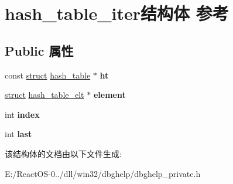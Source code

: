 \hypertarget{structhash__table__iter}{}\section{hash\+\_\+table\+\_\+iter结构体 参考}
\label{structhash__table__iter}
\subsection*{Public 属性}
\begin{DoxyCompactItemize}
\item 
\mbox{\label{structhash__table__iter_a9c7711461eefb446afc3075f40d1921c}} 
const \hyperlink{interfacestruct}{struct} \hyperlink{structhash__table}{hash\+\_\+table} $\ast$ {\bfseries ht}
\item 
\mbox{\label{structhash__table__iter_a4a2b88d32cbe86902d2c69e446b9d430}} 
\hyperlink{interfacestruct}{struct} \hyperlink{structhash__table__elt}{hash\+\_\+table\+\_\+elt} $\ast$ {\bfseries element}
\item 
\mbox{\label{structhash__table__iter_af8f2dc8cb065f8d716a50fe6f27ced74}} 
int {\bfseries index}
\item 
\mbox{\label{structhash__table__iter_aa6f52cdb888d4850fdef23527fae5e0d}} 
int {\bfseries last}
\end{DoxyCompactItemize}


该结构体的文档由以下文件生成\+:\begin{DoxyCompactItemize}
\item 
E\+:/\+React\+O\+S-\/0../dll/win32/dbghelp/dbghelp\+\_\+private.\+h\end{DoxyCompactItemize}
